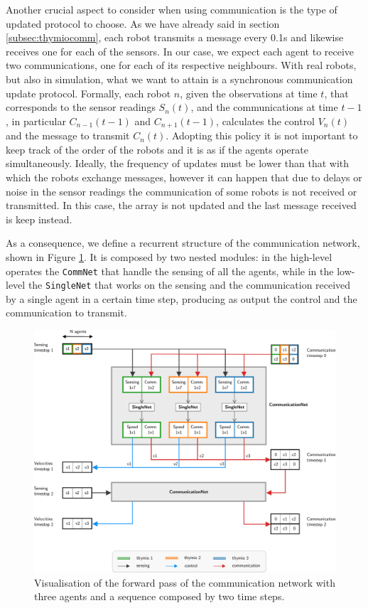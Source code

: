 Another crucial aspect to consider when using communication is the type of   
updated protocol to choose. As we have already said in section 
\ref{subsec:thymiocomm}, each robot transmits a message every 0.1\gls{s} 
and likewise receives one for each of the sensors. In our case, we expect 
each agent to receive two communications, one for each of its respective 
neighbours. 
With real robots, but also in simulation, what we want to attain is a 
synchronous communication update protocol. Formally, each robot $n$, 
given the observations at time $t$, that corresponds to the sensor readings 
$S_n(t)$, and the communications at time $t-1$, in particular $C_{n-1}(t-1)$ 
and $C_{n+1}(t-1)$, calculates the control $V_n(t)$ and the message to 
transmit $C_n(t)$. 
Adopting this policy it is not important to keep track of the order of the 
robots and it is as if the agents operate simultaneously. 
Ideally, the frequency of updates must be lower than that with which the 
robots exchange messages, however it can happen that due to delays or 
noise in the sensor readings the communication of some robots is not 
received or transmitted. In this case, the array is not updated and the last 
message received is keep instead. 

As a consequence, we define a recurrent structure of the communication 
network, shown in Figure \ref{fig:commnet1}. It is composed by two nested 
modules: in the high-level operates the \texttt{CommNet} that handle the 
sensing of all the agents, while in the low-level the \texttt{SingleNet} that 
works on the sensing and the communication received by a single agent in a 
certain time step, producing as output the control and the communication to 
transmit. 
\begin{figure}[!htb]
	\centering
	\includegraphics[width=\textwidth]{contents/images/commnet2}
	\caption[Communication network.]{Visualisation of the forward pass of the 
		communication network with three agents and a sequence composed by two 
		time steps.}
	\label{fig:commnet1}
\end{figure}

